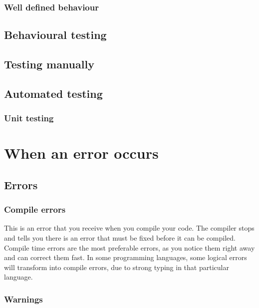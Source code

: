 \documentclass[11pt,a4paper,twoside]{article}
\begin{document}
\subsubsection{Well defined behaviour}

\subsection{Behavioural testing}

\subsection{Testing manually}

\subsection{Automated testing}

\subsubsection{Unit testing}


\section{When an error occurs}

\subsection{Errors}

\subsubsection{Compile errors}

This is an error that you receive when you compile your code. The compiler
stops and tells you there is an error that must be fixed before it can be
compiled. Compile time errors are the most preferable errors, as you notice
them right away and can correct them fast. In some programming languages, some
logical errors will transform into compile errors, due to strong typing in that
particular language. 

\subsubsection{Warnings}
\end{document}
